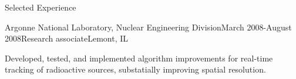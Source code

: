 \documentclass{resume} %
\begin{document}
\begin{rSection}{Selected Experience}

\begin{rSubsection}{Argonne National Laboratory, Nuclear Engineering
Division}{March 2008-August 2008}{Research associate}{Lemont, IL}
\item Developed, tested, and implemented algorithm improvements for real-time
tracking of radioactive sources, substatially improving spatial resolution.
\end{rSubsection}


\end{rSection}


%
%
\end{document}
